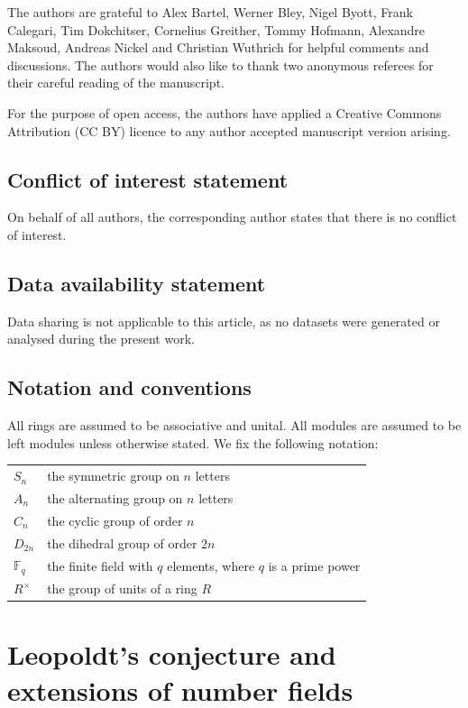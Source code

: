 \documentclass[12pt]{amsart}
\theoremstyle{plain}
\theoremstyle{remark}
\theoremstyle{definition}
\newcommand{\F}{\mathbb{F}}
\numberwithin{equation}{section}
\begin{document}
The authors are grateful to Alex Bartel, Werner Bley, Nigel Byott, Frank Calegari, 
Tim Dokchitser, Cornelius Greither, 
Tommy Hofmann, Alexandre Maksoud, Andreas Nickel and Christian Wuthrich
for helpful comments and discussions. 
The authors would also like to thank two anonymous referees
for their careful reading of the manuscript.

For the purpose of open access, the authors have applied a Creative Commons Attribution (CC BY) licence 
to any author accepted manuscript version arising.

\subsection*{Conflict of interest statement}
On behalf of all authors, the corresponding author states that there is no conflict of interest.

\subsection*{Data availability statement}
Data sharing is not applicable to this article, as no datasets were generated or analysed during the present work.

\subsection*{Notation and conventions}
All rings are assumed to be associative and unital. 
All modules are assumed to be left modules unless otherwise  stated. 
We fix the following notation:

\medskip

\begin{tabular}{ll}
$S_{n}$ & the symmetric group on $n$ letters \\
$A_{n}$ & the alternating group on $n$ letters \\
$C_{n}$ & the cyclic group of order $n$ \\
$D_{2n}$ & the dihedral group of order $2n$\\
$\F_{q}$ & the finite field with $q$ elements, where $q$ is a prime power\\
$R^{\times}$ & the group of units of a ring $R$
\end{tabular}

\section{Leopoldt's conjecture and extensions of number fields}
\end{document}
